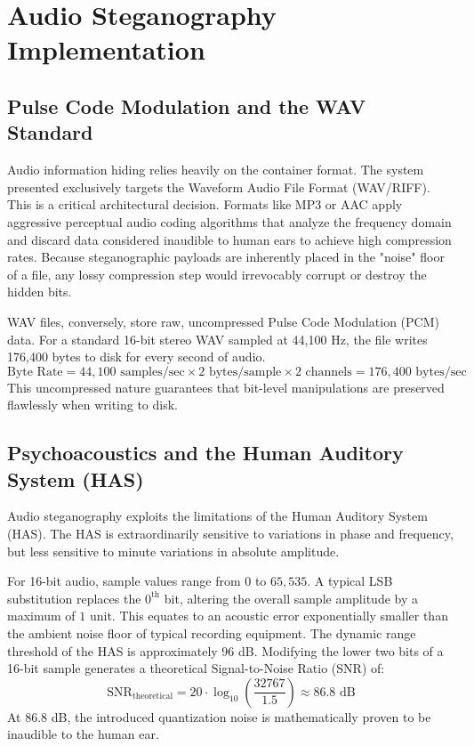 \documentclass[12pt,a4paper]{report}
\begin{document}
\chapter{Audio Steganography Implementation}

\section{Pulse Code Modulation and the WAV Standard}
Audio information hiding relies heavily on the container format. The system presented exclusively targets the Waveform Audio File Format (WAV/RIFF). This is a critical architectural decision. Formats like MP3 or AAC apply aggressive perceptual audio coding algorithms that analyze the frequency domain and discard data considered inaudible to human ears to achieve high compression rates. Because steganographic payloads are inherently placed in the "noise" floor of a file, any lossy compression step would irrevocably corrupt or destroy the hidden bits. 

WAV files, conversely, store raw, uncompressed Pulse Code Modulation (PCM) data. For a standard 16-bit stereo WAV sampled at 44,100 Hz, the file writes 176,400 bytes to disk for every second of audio. 
$$ \text{Byte Rate} = 44,100 \text{ samples/sec} \times 2 \text{ bytes/sample} \times 2 \text{ channels} = 176,400 \text{ bytes/sec} $$
This uncompressed nature guarantees that bit-level manipulations are preserved flawlessly when writing to disk.

\section{Psychoacoustics and the Human Auditory System (HAS)}
Audio steganography exploits the limitations of the Human Auditory System (HAS). The HAS is extraordinarily sensitive to variations in phase and frequency, but less sensitive to minute variations in absolute amplitude. 

For 16-bit audio, sample values range from $0$ to $65,535$. A typical LSB substitution replaces the $0^{\text{th}}$ bit, altering the overall sample amplitude by a maximum of $1$ unit. This equates to an acoustic error exponentially smaller than the ambient noise floor of typical recording equipment. The dynamic range threshold of the HAS is approximately 96 dB. Modifying the lower two bits of a 16-bit sample generates a theoretical Signal-to-Noise Ratio (SNR) of:
\begin{equation}
    \text{SNR}_{\text{theoretical}} = 20 \cdot \log_{10}\left(\frac{32767}{1.5}\right) \approx 86.8 \text{ dB}
\end{equation}
At 86.8 dB, the introduced quantization noise is mathematically proven to be inaudible to the human ear.
\end{document}
